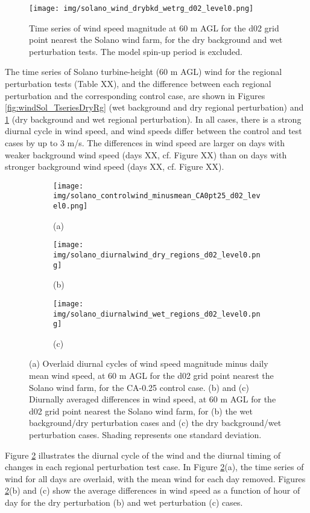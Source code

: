 \begin{figure}[here]
\texttt{[image: img/solano\_wind\_drybkd\_wetrg\_d02\_level0.png]}
\caption{Time series of wind speed magnitude at 60 m AGL for the d02 grid point nearest the Solano wind farm, for the dry background and wet perturbation tests.  The model spin-up period is excluded.}
\label{fig:windSol_TseriesWetRg}
\end{figure}

The time series of Solano turbine-height (60 m AGL) wind for the regional perturbation tests (Table XX), and the difference between each regional perturbation and the corresponding control case, are shown in Figures \ref{fig:windSol_TseriesDryRg} (wet background and dry regional perturbation) and \ref{fig:windSol_TseriesWetRg} (dry background and wet regional perturbation).  In all cases, there is a strong diurnal cycle in wind speed, and wind speeds differ between the control and test cases by up to 3 m/s.  The differences in wind speed are larger on days with weaker background wind speed (days XX, cf. Figure XX) than on days with stronger background wind speed (days XX, cf. Figure XX).

\begin{figure}[here]
\begin{subfigure}{0.6\textwidth}
\texttt{[image: img/solano\_controlwind\_minusmean\_CA0pt25\_d02\_level0.png]}
\caption{(a)}
\end{subfigure}
\begin{subfigure}{0.6\textwidth}
\texttt{[image: img/solano\_diurnalwind\_dry\_regions\_d02\_level0.png]}
\caption{(b)}
\end{subfigure}
\begin{subfigure}{0.6\textwidth}
\texttt{[image: img/solano\_diurnalwind\_wet\_regions\_d02\_level0.png]}
\caption{(c)}
\end{subfigure}
\caption{(a) Overlaid diurnal cycles of wind speed magnitude minus daily mean wind speed, at 60 m AGL for the d02 grid point nearest the Solano wind farm, for the CA-0.25 control case.  (b) and (c) Diurnally averaged differences in wind speed, at 60 m AGL for the d02 grid point nearest the Solano wind farm, for (b) the wet background/dry perturbation cases and (c) the dry background/wet perturbation cases.  Shading represents one standard deviation.}
\label{fig:windSol_DiffDiurnalWetRg}
\end{figure}

Figure \ref{fig:windSol_DiffDiurnalWetRg} illustrates the diurnal cycle of the wind and the diurnal timing of changes in each regional perturbation test case.  In Figure \ref{fig:windSol_DiffDiurnalWetRg}(a), the time series of wind for all days are overlaid, with the mean wind for each day removed.  Figures \ref{fig:windSol_DiffDiurnalWetRg}(b) and (c) show the average differences in wind speed as a function of hour of day for the dry perturbation (b) and wet perturbation (c) cases.

